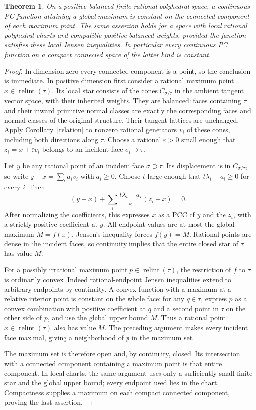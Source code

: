 \documentclass[11pt]{article}
\newtheorem{theorem}{Theorem}
\newcommand{\relint}{\operatorname{relint}}
\begin{document}
\begin{theorem}\label{maximum}
On a positive balanced finite rational polyhedral space, a continuous PC function attaining a global maximum is constant on the connected component of each maximum point. The same assertion holds for a space with local rational polyhedral charts and compatible positive balanced weights, provided the function satisfies these local Jensen inequalities. In particular every continuous PC function on a compact connected space of the latter kind is constant.
\end{theorem}
\begin{proof}
In dimension zero every connected component is a point, so the conclusion is immediate. In positive dimension first consider a rational maximum point $x\in\relint(\tau)$. Its local star consists of the cones $C_{\sigma/\tau}$ in the ambient tangent vector space, with their inherited weights. They are balanced: faces containing $\tau$ and their inward primitive normal classes are exactly the corresponding faces and normal classes of the original structure. Their tangent lattices are unchanged. Apply Corollary~\ref{relation} to nonzero rational generators $v_i$ of these cones, including both directions along $\tau$. Choose a rational $\varepsilon>0$ small enough that $z_i=x+\varepsilon v_i$ belongs to an incident face $\sigma_i\supset\tau$.

Let $y$ be any rational point of an incident face $\sigma\supset\tau$. Its displacement is in $C_{\sigma/\tau}$, so write $y-x=\sum_i a_i v_i$ with $a_i\geq0$. Choose $t$ large enough that $t\lambda_i-a_i\geq0$ for every $i$. Then
\[(y-x)+\sum_i\frac{t\lambda_i-a_i}{\varepsilon}(z_i-x)=0.
\]
After normalizing the coefficients, this expresses $x$ as a PCC of $y$ and the $z_i$, with a strictly positive coefficient at $y$. All endpoint values are at most the global maximum $M=f(x)$. Jensen's inequality forces $f(y)=M$. Rational points are dense in the incident faces, so continuity implies that the entire closed star of $\tau$ has value $M$.

For a possibly irrational maximum point $p\in\relint(\tau)$, the restriction of $f$ to $\tau$ is ordinarily convex. Indeed rational-endpoint Jensen inequalities extend to arbitrary endpoints by continuity. A convex function with a maximum at a relative interior point is constant on the whole face: for any $q\in\tau$, express $p$ as a convex combination with positive coefficient at $q$ and a second point in $\tau$ on the other side of $p$, and use the global upper bound $M$. Thus a rational point $x\in\relint(\tau)$ also has value $M$. The preceding argument makes every incident face maximal, giving a neighborhood of $p$ in the maximum set.

The maximum set is therefore open and, by continuity, closed. Its intersection with a connected component containing a maximum point is that entire component. In local charts, the same argument uses only a sufficiently small finite star and the global upper bound; every endpoint used lies in the chart. Compactness supplies a maximum on each compact connected component, proving the last assertion.
\end{proof}
\end{document}
